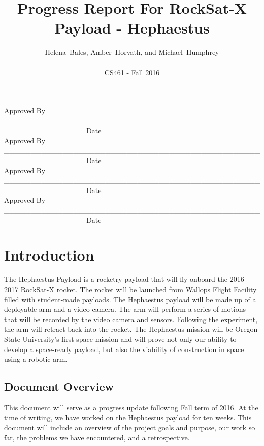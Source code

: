 \documentclass[letterpaper,10pt]{article}
\title{Progress Report For RockSat-X Payload - Hephaestus}
\author{Helena~Bales, Amber~Horvath, and Michael~Humphrey\\ \\ CS461 - Fall 2016}
\newenvironment{bottompar}{\par\vspace*{\fill}}{\clearpage}
\begin{document}
\maketitle

\begin{abstract}
\end{abstract}

\begin{bottompar}
Approved By
\_\_\_\_\_\_\_\_\_\_\_\_\_\_\_\_\_\_\_\_\_\_\_\_\_\_\_\_\_\_\_\_\_\_\_\_\_\_\_\_\_\_\_\_\_\_\_\_\_\_\_\_\_\_\_\_\_\_\_\_\_\_\_
Date \_\_\_\_\_\_\_\_\_\_\_\_\_\_\_\_\_\_\_\_\_\_\_\_\_\_\_\_ \\


Approved By
\_\_\_\_\_\_\_\_\_\_\_\_\_\_\_\_\_\_\_\_\_\_\_\_\_\_\_\_\_\_\_\_\_\_\_\_\_\_\_\_\_\_\_\_\_\_\_\_\_\_\_\_\_\_\_\_\_\_\_\_\_\_\_
Date \_\_\_\_\_\_\_\_\_\_\_\_\_\_\_\_\_\_\_\_\_\_\_\_\_\_\_\_ \\


Approved By
\_\_\_\_\_\_\_\_\_\_\_\_\_\_\_\_\_\_\_\_\_\_\_\_\_\_\_\_\_\_\_\_\_\_\_\_\_\_\_\_\_\_\_\_\_\_\_\_\_\_\_\_\_\_\_\_\_\_\_\_\_\_\_
Date \_\_\_\_\_\_\_\_\_\_\_\_\_\_\_\_\_\_\_\_\_\_\_\_\_\_\_\_ \\


Approved By
\_\_\_\_\_\_\_\_\_\_\_\_\_\_\_\_\_\_\_\_\_\_\_\_\_\_\_\_\_\_\_\_\_\_\_\_\_\_\_\_\_\_\_\_\_\_\_\_\_\_\_\_\_\_\_\_\_\_\_\_\_\_\_
Date \_\_\_\_\_\_\_\_\_\_\_\_\_\_\_\_\_\_\_\_\_\_\_\_\_\_\_\_ \\
\end{bottompar}

\clearpage
\tableofcontents
\clearpage

\section{Introduction}
The Hephaestus Payload is a rocketry payload that will fly onboard the 2016-2017 RockSat-X rocket. 
The rocket will be launched from Wallops Flight Facility filled with student-made payloads. 
The Hephaestus payload will be made up of a deployable arm and a video camera. The arm will perform 
a series of motions that will be recorded by the video camera and sensors. Following the experiment, the 
arm will retract back into the rocket. The Hephaestus mission will be Oregon State University's first 
space mission and will prove not only our ability to develop a space-ready payload, but also the 
viability of construction in space using a robotic arm.

\subsection{Document Overview}
This document will serve as a progress update following Fall term of 2016. At the time of writing, we 
have worked on the Hephaestus payload for ten weeks. This document will include an overview of the 
project goals and purpose, our work so far, the problems we have encountered, and a retrospective.
\end{document}
